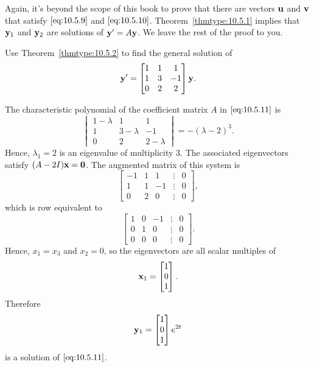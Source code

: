 \documentclass{ximera}
\begin{document}
Again, it's beyond the scope of this book to prove that there are
vectors ${\bf u}$ and ${\bf v}$ that satisfy $\eqref{eq:10.5.9}$ and
$\eqref{eq:10.5.10}$. Theorem~\ref{thmtype:10.5.1} implies that ${\bf y}_1$ and
${\bf y}_2$ are solutions of ${\bf y}'=A{\bf y}$. We leave the rest of
the proof to you.%

\begin{example}\label{example:10.5.4}
Use Theorem~\ref{thmtype:10.5.2} to find the general solution of
\begin{equation}\label{eq:10.5.11}
{\bf y}'=\begin{bmatrix}1&1&1\\1&3&-1\\0&2&2\end{bmatrix}{\bf y}.
\end{equation}

\begin{explanation}  The characteristic polynomial of
the coefficient matrix $A$ in  $\eqref{eq:10.5.11}$ is
$$
\begin{vmatrix} 1-\lambda & 1 & 1\\ 1 & 3-\lambda
&
-1\\ 0 & 2 & 2-\lambda\end{vmatrix}=-(\lambda-2)^3.
$$
Hence, $\lambda_1=2$ is an eigenvalue of multiplicity $3$. The
associated eigenvectors satisfy $(A-2I){\bf x=0}$. The augmented
matrix of this system is
$$
\begin{bmatrix} -1 & 1 & 1 &\vdots & 0\\
1& 1 & -1 &\vdots & 0\\ 0 & 2 & 0 &
\vdots & 0\end{bmatrix},
$$
which is row equivalent to
$$
\begin{bmatrix} 1 & 0 &- 1 &\vdots& 0\\ 0 & 1 & 0  &\vdots& 0
\\ 0 & 0 & 0 &\vdots&0\end{bmatrix}.
$$
Hence, $x_1 =x_3$ and  $x_2 = 0$, so the eigenvectors are all scalar
multiples of
$$
{\bf x}_1=\begin{bmatrix}1\\0\\1\end{bmatrix}.
$$
Therefore
$$
{\bf y}_1=\begin{bmatrix}1\\0\\1\end{bmatrix}e^{2t}
$$
is a solution of  $\eqref{eq:10.5.11}$.


\end{explanation}
\end{example}
\end{document}
